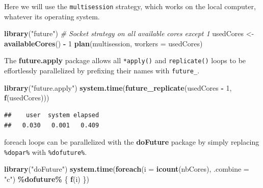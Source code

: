 \documentclass[
  12pt,
  american,
  a4paper,
  extrafontsizes,onecolumn,openright
  ]{memoir}
\newenvironment{Shaded}{\begin{snugshade}}{\end{snugshade}}
\newcommand{\AttributeTok}[1]{\textcolor[rgb]{0.13,0.29,0.53}{#1}}
\newcommand{\CommentTok}[1]{\textcolor[rgb]{0.56,0.35,0.01}{\textit{#1}}}
\newcommand{\DecValTok}[1]{\textcolor[rgb]{0.00,0.00,0.81}{#1}}
\newcommand{\FunctionTok}[1]{\textcolor[rgb]{0.13,0.29,0.53}{\textbf{#1}}}
\newcommand{\NormalTok}[1]{#1}
\newcommand{\OtherTok}[1]{\textcolor[rgb]{0.56,0.35,0.01}{#1}}
\newcommand{\SpecialCharTok}[1]{\textcolor[rgb]{0.81,0.36,0.00}{\textbf{#1}}}
\newcommand{\StringTok}[1]{\textcolor[rgb]{0.31,0.60,0.02}{#1}}
\begin{document}
Here we will use the \texttt{multisession} strategy, which works on the local computer, whatever its operating system.

\scriptsize

\begin{Shaded}
\begin{Highlighting}[]
\FunctionTok{library}\NormalTok{(}\StringTok{"future"}\NormalTok{)}
\CommentTok{\# Socket strategy on all available cores except 1}
\NormalTok{usedCores }\OtherTok{\textless{}{-}} \FunctionTok{availableCores}\NormalTok{() }\SpecialCharTok{{-}} \DecValTok{1}
\FunctionTok{plan}\NormalTok{(multisession, }\AttributeTok{workers =}\NormalTok{ usedCores)}
\end{Highlighting}
\end{Shaded}

\normalsize

The \textbf{future.apply} package allows all \texttt{*apply()} and \texttt{replicate()} loops to be effortlessly parallelized by prefixing their names with \texttt{future\_}.

\scriptsize

\begin{Shaded}
\begin{Highlighting}[]
\FunctionTok{library}\NormalTok{(}\StringTok{"future.apply"}\NormalTok{)}
\FunctionTok{system.time}\NormalTok{(}\FunctionTok{future\_replicate}\NormalTok{(usedCores }\SpecialCharTok{{-}} \DecValTok{1}\NormalTok{, }\FunctionTok{f}\NormalTok{(usedCores)))}
\end{Highlighting}
\end{Shaded}

\begin{verbatim}
##    user  system elapsed 
##   0.030   0.001   0.409
\end{verbatim}

\normalsize

foreach loops can be parallelized with the \textbf{doFuture} package by simply replacing \texttt{\%dopar\%} with \texttt{\%dofuture\%}.

\scriptsize

\begin{Shaded}
\begin{Highlighting}[]
\FunctionTok{library}\NormalTok{(}\StringTok{"doFuture"}\NormalTok{)}
\FunctionTok{system.time}\NormalTok{(}\FunctionTok{foreach}\NormalTok{(}\AttributeTok{i =} \FunctionTok{icount}\NormalTok{(nbCores), }\AttributeTok{.combine =} \StringTok{"c"}\NormalTok{) }\SpecialCharTok{\%dofuture\%}
\NormalTok{    \{}
        \FunctionTok{f}\NormalTok{(i)}
\NormalTok{    \})}
\end{Highlighting}
\end{Shaded}
\end{document}
